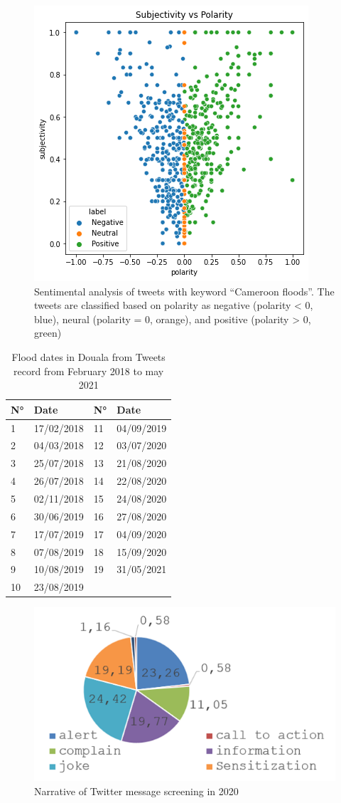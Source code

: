 \begin{figure}[hbt!]
	\centering
	\includegraphics[width=0.8\linewidth]{figure/Sentimentalanalysis.png}
	\caption{Sentimental analysis of tweets with keyword “Cameroon floods”. The tweets are classified based on polarity as negative (polarity < 0, blue), neural (polarity = 0, orange), and positive (polarity > 0, green)}
	\label{fig:Sentimentalanalysis}
\end{figure}

\begin{table}[hbt!]\centering
\begin{tabular}{llll}
\hline
N° & Date       & N° & Date       \\
\hline
1  & 17/02/2018 & 11 & 04/09/2019 \\
2  & 04/03/2018 & 12 & 03/07/2020 \\
3  & 25/07/2018 & 13 & 21/08/2020 \\
4  & 26/07/2018 & 14 & 22/08/2020 \\
5  & 02/11/2018 & 15 & 24/08/2020 \\
6  & 30/06/2019 & 16 & 27/08/2020 \\
7  & 17/07/2019 & 17 & 04/09/2020 \\
8  & 07/08/2019 & 18 & 15/09/2020 \\
9  & 10/08/2019 & 19 & 31/05/2021 \\
10 & 23/08/2019 &    &  \\
\hline        
\end{tabular}
\caption{\label{table:twitteranalysis2020} Flood dates in Douala from Tweets record from February 2018 to may 2021}
\end{table}


\begin{figure}[hbt!]
	\centering
	\includegraphics[width=0.8\linewidth]{figure/twitter_analysis_2020.png}
	\caption{Narrative of Twitter message screening in 2020}
	\label{fig:twitteranalysis2020}
\end{figure}
